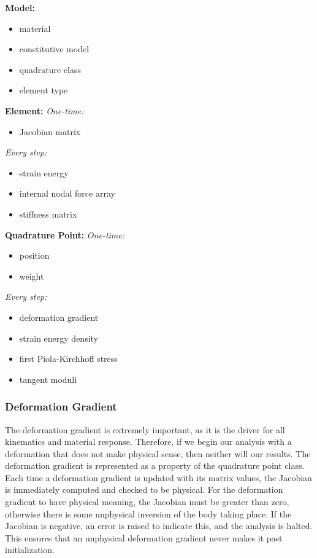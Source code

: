 \documentclass[]{spie}  %
\begin{document}
\noindent
\textbf{Model:}
\begin{itemize}
	\item material
	\item constitutive model
	\item quadrature class
	\item element type
\end{itemize}

\noindent
\textbf{Element:} \smallbreak
\indent \textit{One-time:}
\begin{itemize}
	\item Jacobian matrix
\end{itemize}
\smallbreak \textit{Every step:}
\begin{itemize}
	\item strain energy
	\item internal nodal force array
	\item stiffness matrix
\end{itemize}

\noindent
\textbf{Quadrature Point:} \smallbreak
\textit{One-time:}
\begin{itemize}
	\item position
	\item weight
\end{itemize}
\smallbreak \textit{Every step:}
\begin{itemize}
	\item deformation gradient
	\item strain energy density
	\item first Piola-Kirchhoff stress
	\item tangent moduli
\end{itemize}


\subsubsection{Deformation Gradient}
The deformation gradient is extremely important, as it is the driver for all kinematics and material response. Therefore, if we begin our analysis with a deformation that does not make physical sense, then neither will our results. The deformation gradient is represented as a property of the quadrature point class. Each time a deformation gradient is updated with its matrix values, the Jacobian is immediately computed and checked to be physical. For the deformation gradient to have physical meaning, the Jacobian must be greater than zero, otherwise there is some unphysical inversion of the body taking place. If the Jacobian is negative, an error is raised to indicate this, and the analysis is halted. This ensures that an unphysical deformation gradient never makes it past initialization. 
\end{document}
